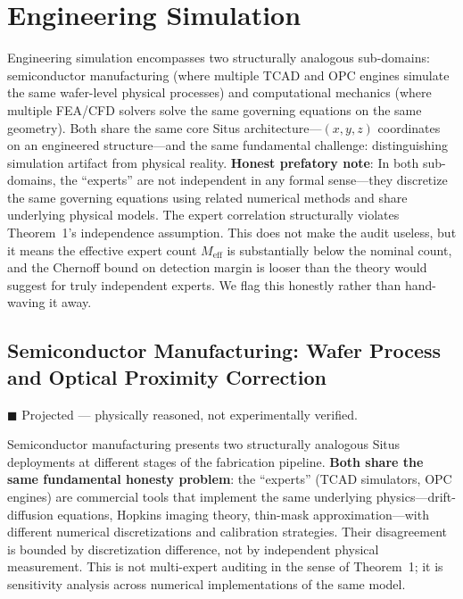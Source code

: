 \documentclass[12pt,a4paper]{article}
\begin{document}
\section{Engineering Simulation}
\label{sec:engineering}

Engineering simulation encompasses two structurally analogous sub-domains: semiconductor manufacturing (where multiple TCAD and OPC engines simulate the same wafer-level physical processes) and computational mechanics (where multiple FEA/CFD solvers solve the same governing equations on the same geometry). Both share the same core Situs architecture—$(x,y,z)$ coordinates on an engineered structure—and the same fundamental challenge: distinguishing simulation artifact from physical reality. \textbf{Honest prefatory note}: In both sub-domains, the ``experts'' are not independent in any formal sense—they discretize the same governing equations using related numerical methods and share underlying physical models. The expert correlation structurally violates Theorem~1's independence assumption. This does not make the audit useless, but it means the effective expert count $M_{\text{eff}}$ is substantially below the nominal count, and the Chernoff bound on detection margin is looser than the theory would suggest for truly independent experts. We flag this honestly rather than hand-waving it away.

\subsection{Semiconductor Manufacturing: Wafer Process and Optical Proximity Correction}

\textcolor{projected}{$\blacksquare$ Projected — physically reasoned, not experimentally verified.}

Semiconductor manufacturing presents two structurally analogous Situs deployments at different stages of the fabrication pipeline. \textbf{Both share the same fundamental honesty problem}: the ``experts'' (TCAD simulators, OPC engines) are commercial tools that implement the same underlying physics—drift-diffusion equations, Hopkins imaging theory, thin-mask approximation—with different numerical discretizations and calibration strategies. Their disagreement is bounded by discretization difference, not by independent physical measurement. This is not multi-expert auditing in the sense of Theorem~1; it is sensitivity analysis across numerical implementations of the same model.
\end{document}
